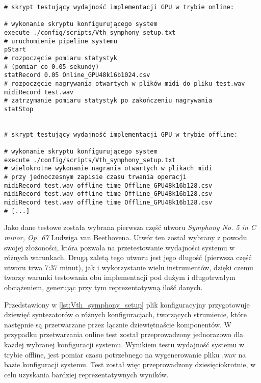 \clearpage
{}
\begin{lstlisting}
# skrypt testujący wydajność implementacji GPU w trybie online:

# wykonanie skryptu konfigurującego system
execute ./config/scripts/Vth_symphony_setup.txt
# uruchomienie pipeline systemu
pStart
# rozpoczęcie pomiaru statystyk 
# (pomiar co 0.05 sekundy)
statRecord 0.05 Online_GPU48k16b1024.csv
# rozpoczęcie nagrywania otwartych w plików midi do pliku test.wav
midiRecord test.wav
# zatrzymanie pomiaru statystyk po zakończeniu nagrywania 
statStop


# skrypt testujący wydajność implementacji GPU w trybie offline:

# wykonanie skryptu konfigurującego system
execute ./config/scripts/Vth_symphony_setup.txt
# wielokrotne wykonanie nagrania otwartych w plikach midi
# przy jednoczesnym zapisie czasu trwania operacji
midiRecord test.wav offline time Offline_GPU48k16b128.csv
midiRecord test.wav offline time Offline_GPU48k16b128.csv
midiRecord test.wav offline time Offline_GPU48k16b128.csv
# [...] 
\end{lstlisting}

Jako dane testowe została wybrana pierwsza część utworu \textit{Symphony No. 5 in C minor, Op. 67} Ludwiga van Beethovena. Utwór ten został wybrany z powodu swojej złożoności, która pozwala na przetestowanie wydajności systemu w różnych warunkach. Drugą zaletą tego utworu jest jego długość (pierwsza część utworu trwa 7:37 minut), jak i wykorzystanie wielu instrumentów, dzięki czemu tworzy warunki testowania obu implementacji pod dużym i długotrwałym obciążeniem, generując przy tym reprezentatywną ilość danych.

\vspace{10pt}Przedstawiony w \ref{lst:Vth_symphony_setup} plik konfiguracyjny przygotowuje dziewięć syntezatorów o różnych konfiguracjach, tworzących strumienie, które następnie są przetwarzane przez łącznie dziewiętnaście komponentów. W przypadku przetwarzania online test został przeprowadzony jednorazowo dla każdej wybranej konfiguracji systemu. Wynikiem testu wydajność systemu w trybie offline, jest pomiar czasu potrzebnego na wygenerowanie pliku .wav na bazie konfiguracji systemu. Test został więc przeprowadzony dziesięciokrotnie, w celu uzyskania bardziej reprezentatywnych wyników.

